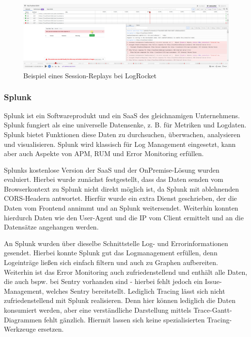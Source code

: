 \begin{figure}[H]
	\centering
	\includegraphics[width=\linewidth]{img/03_methoden/logrocket_session-replay-example.png}
	\caption{Beispiel eines Session-Replays bei LogRocket}
	\label{fig:logrocket-session-replay-example}
\end{figure}

\subsubsection{Splunk}

Splunk \cite{Splunk} ist ein Softwareprodukt und ein SaaS des gleichnamigen Unternehmens. Splunk fungiert als eine universelle Datensenke, z. B. für Metriken und Logdaten. Splunk bietet Funktionen diese Daten zu durchsuchen, überwachen, analysieren und visualisieren. Splunk wird klassisch für Log Management eingesetzt, kann aber auch Aspekte von APM, RUM und Error Monitoring erfüllen.

Splunks kostenlose Version der SaaS und der OnPremise-Lösung wurden evaluiert. Hierbei wurde zunächst festgestellt, dass das Daten senden vom Browserkontext zu Splunk nicht direkt möglich ist, da Splunk mit ablehnenden CORS-Headern antwortet. Hierfür wurde ein extra Dienst geschrieben, der die Daten vom Frontend annimmt und an Splunk weitersendet. Weiterhin konnten hierdurch Daten wie den User-Agent und die IP vom Client ermittelt und an die Datensätze angehangen werden.

An Splunk wurden über dieselbe Schnittstelle Log- und Errorinformationen gesendet. Hierbei konnte Splunk gut das Logmanagement erfüllen, denn Logeinträge ließen sich einfach filtern und auch zu Graphen aufbereiten. Weiterhin ist das Error Monitoring auch zufriedenstellend und enthält alle Daten, die auch bspw. bei Sentry vorhanden sind - hierbei fehlt jedoch ein Issue-Management, welches Sentry bereitstellt. Lediglich Tracing lässt sich nicht zufriedenstellend mit Splunk realisieren. Denn hier können lediglich die Daten konsumiert werden, aber eine verständliche Darstellung mittels Trace-Gantt-Diagrammen fehlt gänzlich. Hiermit lassen sich keine spezialisierten Tracing-Werkzeuge ersetzen.

